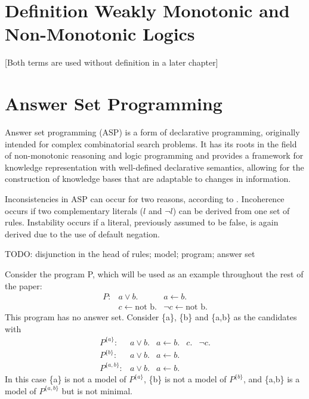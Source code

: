 \section{Definition Weakly Monotonic and Non-Monotonic Logics}
 [Both terms are used without definition in a later chapter]

\section{Answer Set Programming}
Answer set programming (ASP) \cite{gelfond_logic_2002} is a form of declarative programming, originally intended for complex combinatorial search problems. It has its roots in the field of non-monotonic reasoning and logic programming and provides a framework for knowledge representation with well-defined declarative semantics, allowing for the construction of knowledge bases that are adaptable to changes in information.

Inconsistencies in ASP can occur for two reasons, according to \cite{calimeri_characterising_2015}. Incoherence occurs if two complementary literals (\(l\) and \(\neg l\)) can be derived from one set of rules. Instability occurs if a literal, previously assumed to be false, is again derived due to the use of default negation.

TODO: disjunction in the head of rules; model; program; answer set

\begin{example}
    Consider the program P, which will be used as an example throughout the rest of the paper:
    \[\begin{array}{rrr}
            P: & a \lor b.                  & a \leftarrow b.                 \\
               & c \leftarrow \text{not b}. & \neg c \leftarrow \text{not b}.
        \end{array}\]
    This program has no answer set. Consider \{a\}, \{b\} and \{a,b\} as the candidates with
    \[\begin{array}{rrrrr}
            P^{\{a\}}:   & a \lor b. & a \leftarrow b. & c. & \neg c. \\
            P^{\{b\}}:   & a \lor b. & a \leftarrow b.                \\
            P^{\{a,b\}}: & a \lor b. & a \leftarrow b.
        \end{array}\]
    In this case \{a\} is not a model of \(P^{\{a\}}\), \{b\} is not a model of \(P^{\{b\}}\), and \{a,b\} is a model of \(P^{\{a,b\}}\) but is not minimal.
\end{example}

